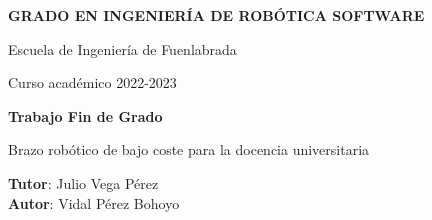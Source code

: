 \thispagestyle{empty}
\vspace{2cm}

\begin{figure}[htb]
  \centerline{}
\end{figure}

\begin{center}
  {\Large {\bf GRADO EN INGENIERÍA DE ROBÓTICA SOFTWARE}}
  \vspace{5mm}
 
  {\large {Escuela de Ingeniería de Fuenlabrada}}
  \vspace{5mm}

  {\large {Curso académico 2022-2023}}

  \vspace{1cm}

  {\large {\bf Trabajo Fin de Grado}}

  \vspace{2cm}

  {\Large {Brazo robótico de bajo coste para la docencia universitaria  \\[1cm] }}

  \vspace{5cm}
  {\bf Tutor}: Julio Vega Pérez \\
  {\bf Autor}: Vidal Pérez Bohoyo
\end{center}

\clearpage
\thispagestyle{empty}
